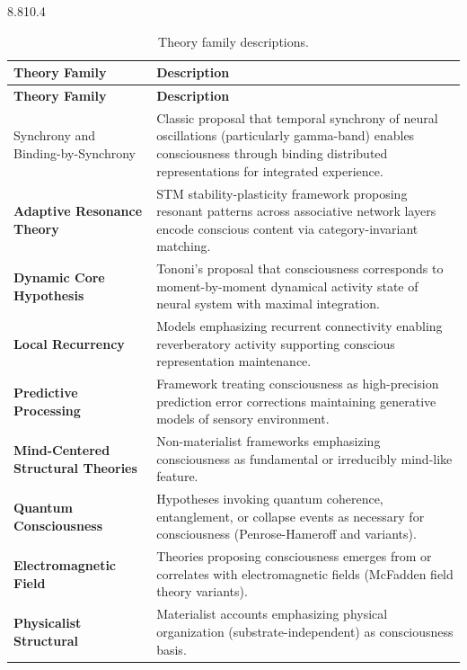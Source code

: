 {\begingroup
\setlength{\tabcolsep}{3pt}
\renewcommand{\arraystretch}{1.12}
\setlength{\LTleft}{0pt}
\setlength{\LTright}{0pt}
\begin{fontsize}{8.8}{10.4}\selectfont
\begin{longtable}{@{}>{\raggedright\arraybackslash\bfseries}p{}>{\raggedright\arraybackslash}p{}@{}}
\caption{Theory family descriptions.}\label{tab:t3_family_descriptions}\\
\toprule
\textbf{Theory Family} & \textbf{Description} \\
\midrule
\endfirsthead

\toprule
\textbf{Theory Family} & \textbf{Description} \\
\midrule
\endhead

Synchrony and Binding-by-Synchrony & Classic proposal that temporal synchrony of neural oscillations (particularly gamma-band) enables consciousness through binding distributed representations for integrated experience. \\
Adaptive Resonance Theory & STM stability-plasticity framework proposing resonant patterns across associative network layers encode conscious content via category-invariant matching. \\
Dynamic Core Hypothesis & Tononi's proposal that consciousness corresponds to moment-by-moment dynamical activity state of neural system with maximal integration. \\
Local Recurrency & Models emphasizing recurrent connectivity enabling reverberatory activity supporting conscious representation maintenance. \\
Predictive Processing & Framework treating consciousness as high-precision prediction error corrections maintaining generative models of sensory environment. \\
Mind-Centered Structural Theories & Non-materialist frameworks emphasizing consciousness as fundamental or irreducibly mind-like feature. \\
Quantum Consciousness & Hypotheses invoking quantum coherence, entanglement, or collapse events as necessary for consciousness (Penrose-Hameroff and variants). \\
Electromagnetic Field & Theories proposing consciousness emerges from or correlates with electromagnetic fields (McFadden field theory variants). \\
Physicalist Structural & Materialist accounts emphasizing physical organization (substrate-independent) as consciousness basis. \\

\end{longtable}
\end{fontsize}}
